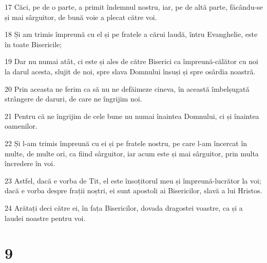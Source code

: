 \par 17 Căci, pe de o parte, a primit îndemnul nostru, iar, pe de altă parte, făcându-se și mai sârguitor, de bună voie a plecat către voi.
\par 18 Și am trimis împreună cu el și pe fratele a cărui laudă, întru Evanghelie, este în toate Bisericile;
\par 19 Dar nu numai atât, ci este și ales de către Biserici ca împreună-călător cu noi la darul acesta, slujit de noi, spre slava Domnului însuși și spre osârdia noastră.
\par 20 Prin aceasta ne ferim ca să nu ne defăimeze cineva, în această îmbelșugată strângere de daruri, de care ne îngrijim noi.
\par 21 Pentru că ne îngrijim de cele bune nu numai înaintea Domnului, ci și înaintea oamenilor.
\par 22 Și l-am trimis împreună cu ei și pe fratele nostru, pe care l-am încercat în multe, de multe ori, ca fiind sârguitor, iar acum este și mai sârguitor, prin multa încredere în voi.
\par 23 Astfel, dacă e vorba de Tit, el este însoțitorul meu și împreună-lucrător la voi; dacă e vorba despre frații noștri, ei sunt apostoli ai Bisericilor, slavă a lui Hristos.
\par 24 Arătați deci către ei, în fața Bisericilor, dovada dragostei voastre, ca și a laudei noastre pentru voi.

\chapter{9}

